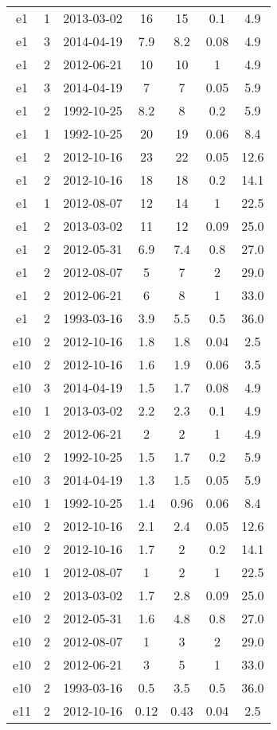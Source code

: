\begin{table*}[htp]
\begin{tabular}{ccccccc}
e1 & 1 & 2013-03-02 & 16 & 15 & 0.1 & 4.9 \\
e1 & 3 & 2014-04-19 & 7.9 & 8.2 & 0.08 & 4.9 \\
e1 & 2 & 2012-06-21 & 10 & 10 & 1 & 4.9 \\
e1 & 3 & 2014-04-19 & 7 & 7 & 0.05 & 5.9 \\
e1 & 2 & 1992-10-25 & 8.2 & 8 & 0.2 & 5.9 \\
e1 & 1 & 1992-10-25 & 20 & 19 & 0.06 & 8.4 \\
e1 & 2 & 2012-10-16 & 23 & 22 & 0.05 & 12.6 \\
e1 & 2 & 2012-10-16 & 18 & 18 & 0.2 & 14.1 \\
e1 & 1 & 2012-08-07 & 12 & 14 & 1 & 22.5 \\
e1 & 2 & 2013-03-02 & 11 & 12 & 0.09 & 25.0 \\
e1 & 2 & 2012-05-31 & 6.9 & 7.4 & 0.8 & 27.0 \\
e1 & 2 & 2012-08-07 & 5 & 7 & 2 & 29.0 \\
e1 & 2 & 2012-06-21 & 6 & 8 & 1 & 33.0 \\
e1 & 2 & 1993-03-16 & 3.9 & 5.5 & 0.5 & 36.0 \\
e10 & 2 & 2012-10-16 & 1.8 & 1.8 & 0.04 & 2.5 \\
e10 & 2 & 2012-10-16 & 1.6 & 1.9 & 0.06 & 3.5 \\
e10 & 3 & 2014-04-19 & 1.5 & 1.7 & 0.08 & 4.9 \\
e10 & 1 & 2013-03-02 & 2.2 & 2.3 & 0.1 & 4.9 \\
e10 & 2 & 2012-06-21 & 2 & 2 & 1 & 4.9 \\
e10 & 2 & 1992-10-25 & 1.5 & 1.7 & 0.2 & 5.9 \\
e10 & 3 & 2014-04-19 & 1.3 & 1.5 & 0.05 & 5.9 \\
e10 & 1 & 1992-10-25 & 1.4 & 0.96 & 0.06 & 8.4 \\
e10 & 2 & 2012-10-16 & 2.1 & 2.4 & 0.05 & 12.6 \\
e10 & 2 & 2012-10-16 & 1.7 & 2 & 0.2 & 14.1 \\
e10 & 1 & 2012-08-07 & 1 & 2 & 1 & 22.5 \\
e10 & 2 & 2013-03-02 & 1.7 & 2.8 & 0.09 & 25.0 \\
e10 & 2 & 2012-05-31 & 1.6 & 4.8 & 0.8 & 27.0 \\
e10 & 2 & 2012-08-07 & 1 & 3 & 2 & 29.0 \\
e10 & 2 & 2012-06-21 & 3 & 5 & 1 & 33.0 \\
e10 & 2 & 1993-03-16 & 0.5 & 3.5 & 0.5 & 36.0 \\
e11 & 2 & 2012-10-16 & 0.12 & 0.43 & 0.04 & 2.5 \\

\end{tabular}
\end{table*}
